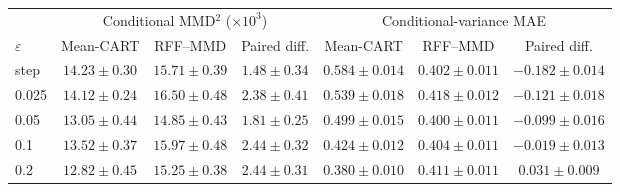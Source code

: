 \begin{tabular}{@{}lcccccc@{}}
\toprule
& \multicolumn{3}{c}{Conditional MMD$^2$ ($\times10^3$)} & \multicolumn{3}{c}{Conditional-variance MAE} \\
\cmidrule(lr){2-4}\cmidrule(l){5-7}
$\varepsilon$ & Mean-CART & RFF--MMD & Paired diff. & Mean-CART & RFF--MMD & Paired diff. \\
\midrule
step & $14.23\pm0.30$ & $15.71\pm0.39$ & $1.48\pm0.34$ & $0.584\pm0.014$ & $0.402\pm0.011$ & $-0.182\pm0.014$ \\
0.025 & $14.12\pm0.24$ & $16.50\pm0.48$ & $2.38\pm0.41$ & $0.539\pm0.018$ & $0.418\pm0.012$ & $-0.121\pm0.018$ \\
0.05 & $13.05\pm0.44$ & $14.85\pm0.43$ & $1.81\pm0.25$ & $0.499\pm0.015$ & $0.400\pm0.011$ & $-0.099\pm0.016$ \\
0.1 & $13.52\pm0.37$ & $15.97\pm0.48$ & $2.44\pm0.32$ & $0.424\pm0.012$ & $0.404\pm0.011$ & $-0.019\pm0.013$ \\
0.2 & $12.82\pm0.45$ & $15.25\pm0.38$ & $2.44\pm0.31$ & $0.380\pm0.010$ & $0.411\pm0.011$ & $0.031\pm0.009$ \\
\bottomrule
\end{tabular}
